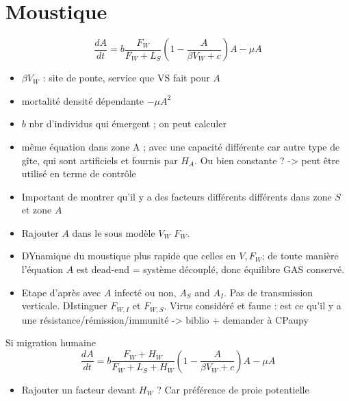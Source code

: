 \documentclass{article}
\begin{document}
\newpage


\section{Moustique}

\begin{equation}
\dfrac{dA}{dt} = b \dfrac{F_W}{F_W + L_S} \left(1 - \dfrac{A}{\beta V_W + c} \right) A - \mu A
\end{equation}
\begin{itemize}
\item $\beta V_W$ : site de ponte, service que VS fait pour $A$
\item mortalité densité dépendante $ - \mu A^2$
\item $b$ nbr d'individus qui émergent ; on peut calculer
\item même équation dans zone A ; avec une capacité différente car autre type de gîte, qui sont artificiels et fournis par $H_A$. Ou bien constante ? -> peut être utilisé en terme de contrôle
\item Important de montrer qu'il y a des facteurs différents différents dans zone $S$ et zone $A$
\item Rajouter $A$ dans le sous modèle $V_W$ $F_W$.
\item DYnamique du moustique plus rapide que celles en $V,F_W$; de toute manière l'équation $A$ est dead-end = système découplé, donc équilibre GAS conservé.
\item Etape d'après avec $A$ infecté ou non, $A_S$ and $A_I$. Pas de transmission verticale. DIstinguer $F_{W, I}$ et $F_{W, S}$. Virus considéré et faune : est ce qu'il y a une résistance/rémission/immunité -> biblio + demander à CPaupy
\end{itemize}
Si migration humaine 
\begin{equation}
\dfrac{dA}{dt} = b \dfrac{F_W + H_W}{F_W + L_S + H_W} \left(1 - \dfrac{A}{\beta V_W + c} \right) A - \mu A
\end{equation}
\begin{itemize}
\item Rajouter un facteur devant $H_W$ ? Car préférence de proie potentielle
\end{itemize}


\newpage
\end{document}
